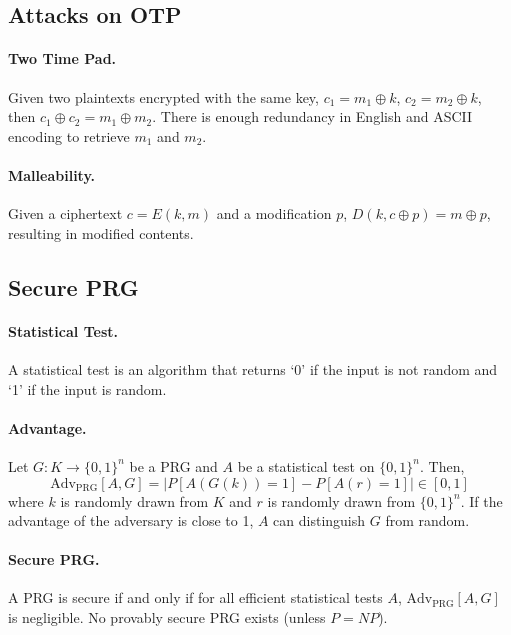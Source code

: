 \documentclass{article}
\begin{document}
\subsection{Attacks on OTP}

\paragraph{Two Time Pad.} Given two plaintexts encrypted with the same key, $c_1 = m_1 \oplus k$, $c_2 = m_2 \oplus k$, then $c_1 \oplus c_2 = m_1 \oplus m_2$. There is enough redundancy in English and ASCII encoding to retrieve $m_1$ and $m_2$.

\paragraph{Malleability.} Given a ciphertext $c = E(k, m)$ and a modification $p$, $D(k, c \oplus p) = m \oplus p$, resulting in modified contents.

\subsection{Secure PRG}

\paragraph{Statistical Test.} A statistical test is an algorithm that returns `0' if the input is not random and `1' if the input is random.

\paragraph{Advantage.} Let $G: K \rightarrow \{0, 1\}^n$ be a PRG and $A$ be a statistical test on $\{0, 1\}^n$. Then, \begin{equation}
  \text{Adv}_\text{PRG}[A, G] = |P[A(G(k)) = 1] - P[A(r) = 1]| \in [0, 1] \label{prg:adv}
\end{equation} where $k$ is randomly drawn from $K$ and $r$ is randomly drawn from $\{0, 1\}^n$. If the advantage of the adversary is close to 1, $A$ can distinguish $G$ from random.

\paragraph{Secure PRG.} A PRG is secure if and only if for all efficient statistical tests $A$, $\text{Adv}_\text{PRG}[A, G]$ is negligible. No provably secure PRG exists (unless $P = NP$).
\end{document}

